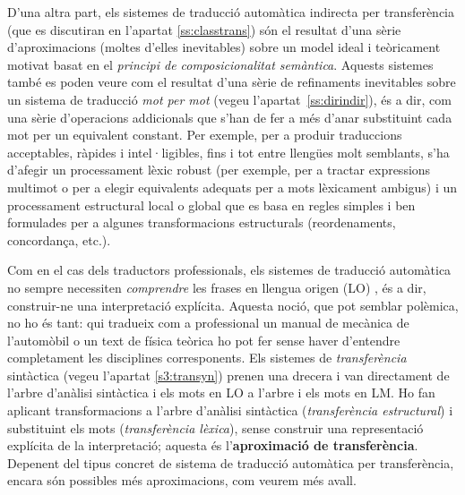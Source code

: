 D'una altra part, els sistemes de traducció automàtica indirecta per
transferència (que es discutiran en l'apartat \ref{ss:classtrans}) són
el resultat d'una sèrie d'aproximacions (moltes d'elles inevitables)
sobre un model ideal i teòricament motivat basat en el \emph{principi
  de composicionalitat semàntica}. Aquests sistemes també es poden veure
com el resultat d'una sèrie de refinaments inevitables sobre un
sistema de traducció \emph{mot per mot} (vegeu
l'apartat~\ref{ss:dirindir}), és a dir, com una sèrie d'operacions
addicionals que s'han de fer a més d'anar substituint cada mot per un
equivalent constant. Per exemple, per a produir traduccions
acceptables, ràpides i intel·ligibles, fins i tot entre llengües molt
semblants, s'ha d'afegir un processament lèxic robust (per exemple,
per a tractar expressions multimot o per a elegir equivalents adequats
per a mots lèxicament ambigus) i un processament estructural local o
global que es basa en regles simples i ben formulades per a algunes
transformacions estructurals (reordenaments, concordança,
etc.). 


Com en el cas dels traductors professionals, els sistemes de traducció
automàtica no sempre necessiten \emph{comprendre} les frases en
llengua origen (LO) , és a dir, construir-ne una interpretació
explícita. Aquesta noció, que pot semblar polèmica, no ho és tant: qui
tradueix com a professional un manual de mecànica de l'automòbil o un
text de física teòrica ho pot fer sense haver d'entendre completament
les disciplines corresponents. Els sistemes de \emph{transferència}
sintàctica (vegeu l'apartat \ref{s3:transyn}) prenen una drecera i van
directament de l'arbre d'anàlisi sintàctica i els mots en LO a l'arbre
i els mots en LM. Ho fan aplicant transformacions a l'arbre d'anàlisi
sintàctica (\emph{transferència estructural}) i substituint els mots
(\emph{transferència lèxica}), sense construir una representació
explícita de la interpretació; aquesta és l'\textbf{aproximació de
  transferència}. Depenent del tipus concret de sistema de traducció
automàtica per transferència, encara són possibles més aproximacions,
com veurem més avall.

